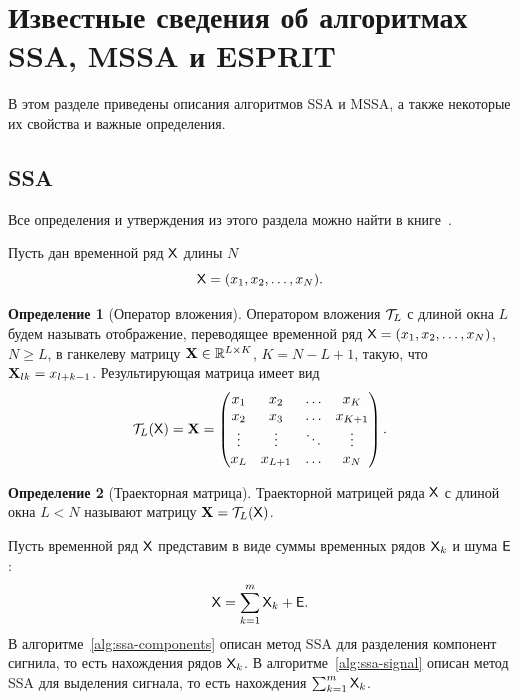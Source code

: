 \documentclass[specialist,
  substylefile=spbu_report.rtx,
subf,href,colorlinks=true, 12pt]{disser}
\theoremstyle{plain}
\theoremstyle{definition}
\newtheorem{definition}{Определение}[section]
\theoremstyle{remark}
\begin{document}
\newpage

\section{Известные сведения об алгоритмах SSA, MSSA и
ESPRIT}\label{sec:known-results-ssa}
В этом разделе приведены описания алгоритмов SSA и MSSA, а также
некоторые их свойства и важные определения.

\subsection{SSA}\label{subsec:ssa}
Все определения и утверждения из этого раздела можно найти в книге~\cite{ssa}.

Пусть дан временной ряд $\mathsf{X}$ длины $N$
\[
  \mathsf{X}=(x_1,x_2,\ldots,x_N).
\]

\begin{definition}[Оператор вложения]
  \label{def:injection-op}
  Оператором вложения $\mathcal{T}_L$ с длиной окна $L$ будем называть
  отображение, переводящее временной ряд
  $\mathsf{X}=(x_1, x_2,\ldots, x_N)$, $N \geqslant L$, в ганкелеву матрицу
  $\mathbf{X}\in \mathbb{R}^{L \times K}$, $K = N-L+1$,
  такую, что $\mathbf{X}_{lk}=x_{l+k-1}$.
  Результирующая матрица имеет вид
  \[
    \mathcal{T}_L(\mathsf{X}) = \mathbf{X} =
    \begin{pmatrix}
      x_1    & x_2     & \ldots & x_K     \\
      x_2    & x_3     & \ldots & x_{K+1} \\
      \vdots & \vdots  & \ddots & \vdots  \\
      x_L    & x_{L+1} & \ldots & x_N
    \end{pmatrix}.
  \]
\end{definition}

\begin{definition}[Траекторная матрица]
  Траекторной матрицей ряда $\mathsf{X}$ с длиной окна $L<N$ называют
  матрицу $\mathbf{X}=\mathcal{T}_L(\mathsf{X})$.
\end{definition}

Пусть временной ряд $\mathsf{X}$ представим в виде суммы временных рядов
$\mathsf{X}_k$ и шума $\mathsf{E}$:
\[
  \mathsf{X} = \sum_{k=1}^{m} \mathsf{X}_k + \mathsf{E}.
\]
В алгоритме~\ref{alg:ssa-components} описан метод SSA для разделения
компонент сигнила, то есть
нахождения рядов $\mathsf{X}_k$.
В алгоритме~\ref{alg:ssa-signal} описан метод SSA для выделения
сигнала, то есть нахождения $\sum_{k=1}^{m} \mathsf{X}_k$.
\end{document}
